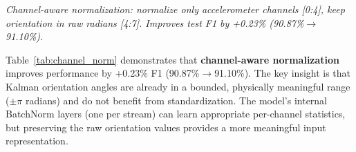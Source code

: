 \begin{table}[htbp]
\centering
\caption{Channel-Aware Normalization Ablation (21-fold LOSO-CV)}
\label{tab:channel_norm}
\vspace{1mm}
\scriptsize
\textit{Channel-aware normalization: normalize only accelerometer channels [0:4], keep orientation in raw radians [4:7]. Improves test F1 by +0.23\% (90.87\%$\rightarrow$91.10\%).}
\end{table}

Table~\ref{tab:channel_norm} demonstrates that \textbf{channel-aware normalization} improves performance by +0.23\% F1 (90.87\%$\rightarrow$91.10\%). The key insight is that Kalman orientation angles are already in a bounded, physically meaningful range ($\pm\pi$ radians) and do not benefit from standardization. The model's internal BatchNorm layers (one per stream) can learn appropriate per-channel statistics, but preserving the raw orientation values provides a more meaningful input representation.

